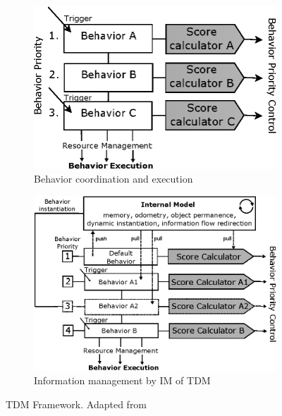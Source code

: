 \begin{figure}[H]
\centering
\begin{subfigure}[b]{0.45\textwidth}
\includegraphics[width=\textwidth]{assets/tdm_priority.eps}
\caption{Behavior coordination and execution}
\label{fig:tdm_priority}
\end{subfigure}%
\hfill
\begin{subfigure}[b]{0.45\textwidth}
\includegraphics[width=\textwidth]{assets/tdm_im.eps}
\caption{Information management by IM of TDM}
\label{fig:tdm_im}
\end{subfigure}%
\caption[Target-drives-means Framework]{TDM Framework. {Adapted from \cite{BerenzTDM2014}}}
\label{fig:tdm1}
\end{figure}
